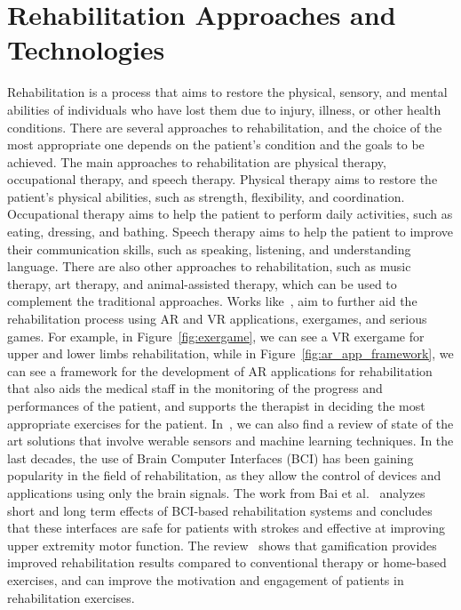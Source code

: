 \section{Rehabilitation Approaches and Technologies}
Rehabilitation is a process that aims to restore the physical, sensory, and mental abilities of individuals who have lost them due to injury, illness, or other health conditions.
There are several approaches to rehabilitation, and the choice of the most appropriate one depends on the patient's condition and the goals to be achieved.
The main approaches to rehabilitation are physical therapy, occupational therapy, and speech therapy.
Physical therapy aims to restore the patient's physical abilities, such as strength, flexibility, and coordination.
Occupational therapy aims to help the patient to perform daily activities, such as eating, dressing, and bathing.
Speech therapy aims to help the patient to improve their communication skills, such as speaking, listening, and understanding language.
There are also other approaches to rehabilitation, such as music therapy, art therapy, and animal-assisted therapy, which can be used to complement the traditional approaches.
Works like~\cite{202306.0333, 5567156, 10.4108/icst.pervasivehealth.2014.255277, trombetta}, aim to further aid the rehabilitation process using AR and VR applications, exergames, and serious games.
For example, in Figure~\ref{fig:exergame}, we can see a VR exergame for upper and lower limbs rehabilitation, while in Figure~\ref{fig:ar_app_framework}, we can see a framework for the development of AR applications for rehabilitation that also aids the medical staff in the monitoring of the progress and performances of the patient, and supports the therapist in deciding the most appropriate exercises for the patient.
In~\cite{BOUKHENNOUFA2022103197}, we can also find a review of state of the art solutions that involve werable sensors and machine learning techniques.
In the last decades, the use of Brain Computer Interfaces (BCI) has been gaining popularity in the field of rehabilitation, as they allow the control of devices and applications using only the brain signals.
The work from Bai et al.~\cite{bai_immediate_2020} analyzes short and long term effects of BCI-based rehabilitation systems and concludes that these interfaces are safe for patients with strokes and effective at improving upper extremity motor function.
The review~\cite{alfieri_gamification_2022} shows that gamification provides improved rehabilitation results compared to conventional therapy or home-based exercises, and can improve the motivation and engagement of patients in rehabilitation exercises.

